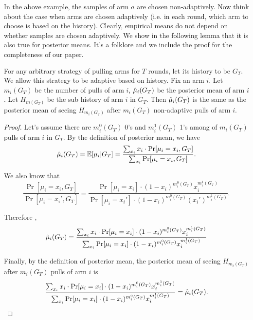In the above example, the samples of arm $a$ are chosen non-adaptively. Now think about the case when arms are chosen adaptively (i.e. in each round, which arm to choose is based on the history). Clearly, empirical means do not depend on whether samples are chosen adaptively. We show in the following lemma that it is also true for posterior means. It's a folklore and we include the proof for the completeness of our paper.
\begin{lemma}
\label{lem:post}
For any arbitrary strategy of pulling arms for $T$ rounds, let its history to be $G_T$. We allow this strategy to be adaptive based on history. Fix an arm $i$. Let $m_i(G_T)$ be the number of pulls of arm $i$, $\hat{\mu}_i(G_T)$ be the posterior mean of arm $i$. Let $H_{m(G_T)}$ be the sub history of arm $i$ in $G_T$. Then $\hat{\mu}_i(G_T)$ is the same as the posterior mean of seeing $H_{m_i(G_T)}$ after $m_i(G_T)$ non-adaptive pulls of arm $i$.
\end{lemma}

\begin{proof}
Let's assume there are $m^0_i(G_T)$ 0's and $m^1_i(G_T)$ 1's among of $m_i(G_T)$ pulls of arm $i$ in $G_T$. By the definition of posterior mean, we have
\[
\hat{\mu}_i(G_T) = \mathbb{E}[\mu_i|G_T] = \frac{\sum_{x_i} x_i \cdot \Pr[\mu_i=x_i, G_T]}{\sum_{x_i} \Pr[\mu_i=x_i, G_T]}.
\]

We also know that 
\[
\frac{\Pr[\mu_i = x_i, G_T]}{\Pr[\mu_i = x_i', G_T]} = \frac{\Pr[\mu_i = x_i] \cdot  (1-x_i)^{m^0_i(G_T)}x_i^{m^1_i(G_T)}}{\Pr[\mu_i = x_i'] \cdot (1-x_i)^{m^0_i(G_T)}(x_i')^{m^1_i(G_T)} }.
\]

Therefore ,
\[
\hat{\mu}_i(G_T) = \frac{\sum_{x_i} x_i \cdot \Pr[\mu_i = x_i] \cdot  (1-x_i)^{m^0_i(G_T)}x_i^{m^1_i(G_T)}}{\sum_{x_i}\Pr[\mu_i = x_i] \cdot  (1-x_i)^{m^0_i(G_T)}x_i^{m^1_i(G_T)}}
\]

Finally, by the definition of posterior mean, the posterior mean of seeing $H_{m_i(G_T)}$ after $m_i(G_T)$ pulls of arm $i$ is
\[
\frac{\sum_{x_i} x_i \cdot \Pr[\mu_i = x_i] \cdot  (1-x_i)^{m^0_i(G_T)}x_i^{m^1_i(G_T)}}{\sum_{x_i}\Pr[\mu_i = x_i] \cdot  (1-x_i)^{m^0_i(G_T)}x_i^{m^1_i(G_T)}} = \hat{\mu}_i(G_T).
\]
\end{proof}


